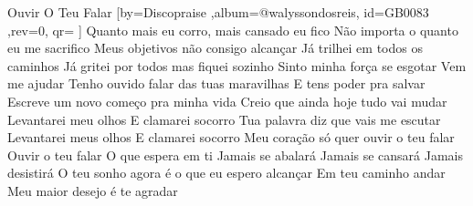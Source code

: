 \beginsong
{Ouvir O Teu Falar %
}[by={Discopraise %
},album={@walyssondosreis},
id={GB0083 %
},rev={0}, %
qr={ %
}]
\beginverse*
Quanto mais eu corro, mais cansado eu fico
Não importa o quanto eu me sacrifico
Meus objetivos não consigo alcançar
Já trilhei em todos os caminhos
Já gritei por todos mas fiquei sozinho
Sinto minha força se esgotar
Vem me ajudar
\endverse
\beginverse*
Tenho ouvido falar das tuas maravilhas
E tens poder pra salvar
Escreve um novo começo pra minha vida
Creio que ainda hoje tudo vai mudar
\endverse
\beginchorus
Levantarei meu olhos
E clamarei socorro
Tua palavra diz que vais me escutar
Levantarei meus olhos
E clamarei socorro
Meu coração só quer ouvir o teu falar
Ouvir o teu falar
\endchorus
\beginverse*
O que espera em ti
Jamais se abalará
Jamais se cansará
Jamais desistirá
O teu sonho agora é o que eu espero alcançar
Em teu caminho andar
Meu maior desejo é te agradar
\endverse

